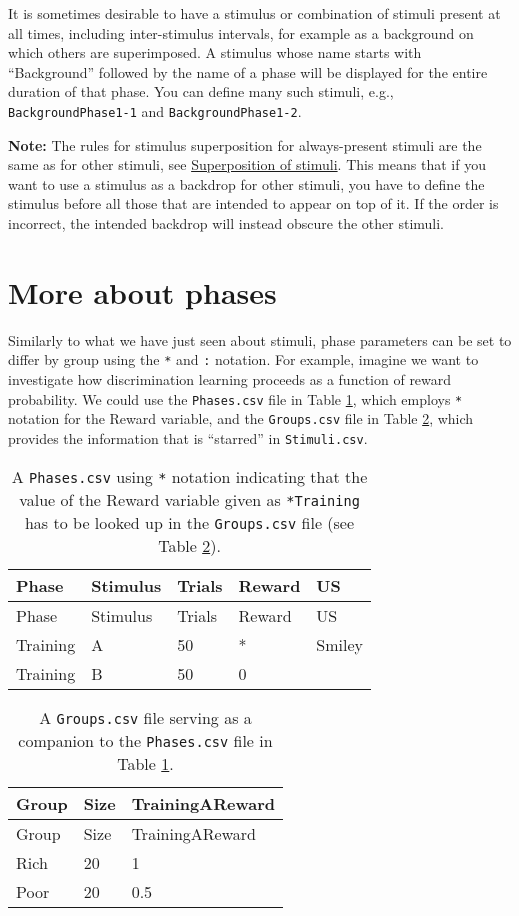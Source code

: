 \documentclass[11pt,]{article}
\begin{document}
It is sometimes desirable to have a stimulus or combination of stimuli
present at all times, including inter-stimulus intervals, for example as
a background on which others are superimposed. A stimulus whose name
starts with ``Background'' followed by the name of a phase will be
displayed for the entire duration of that phase. You can define many
such stimuli, e.g., \texttt{BackgroundPhase1-1} and
\texttt{BackgroundPhase1-2}.

\textbf{Note:} The rules for stimulus superposition for always-present
stimuli are the same as for other stimuli, see
\hyperref[stimulus-superposition]{Superposition of stimuli}. This means
that if you want to use a stimulus as a backdrop for other stimuli, you
have to define the stimulus before all those that are intended to appear
on top of it. If the order is incorrect, the intended backdrop will
instead obscure the other stimuli.

\section{More about phases}\label{more-about-phases}

Similarly to what we have just seen about stimuli, phase parameters can
be set to differ by group using the \texttt{*} and \texttt{:} notation.
For example, imagine we want to investigate how discrimination learning
proceeds as a function of reward probability. We could use the
\texttt{Phases.csv} file in Table \ref{phases-star-notation}, which
employs \texttt{*} notation for the Reward variable, and the
\texttt{Groups.csv} file in Table \ref{groups-phases-star-notation},
which provides the information that is ``starred'' in
\texttt{Stimuli.csv}.

\begin{longtable}[c]{@{}lllll@{}}
\caption{A \texttt{Phases.csv} using \texttt{*} notation indicating that
the value of the Reward variable given as \texttt{*Training} has to be
looked up in the \texttt{Groups.csv} file (see Table
\ref{groups-phases-star-notation}).
\label{phases-star-notation}}\tabularnewline
\toprule
Phase & Stimulus & Trials & Reward & US\tabularnewline
\midrule
\endfirsthead
\toprule
Phase & Stimulus & Trials & Reward & US\tabularnewline
\midrule
\endhead
Training & A & 50 & * & Smiley\tabularnewline
Training & B & 50 & 0 &\tabularnewline
\bottomrule
\end{longtable}

\begin{longtable}[c]{@{}lll@{}}
\caption{A \texttt{Groups.csv} file serving as a companion to the
\texttt{Phases.csv} file in Table \ref{phases-star-notation}.
\label{groups-phases-star-notation}}\tabularnewline
\toprule
Group & Size & TrainingAReward\tabularnewline
\midrule
\endfirsthead
\toprule
Group & Size & TrainingAReward\tabularnewline
\midrule
\endhead
Rich & 20 & 1\tabularnewline
Poor & 20 & 0.5\tabularnewline
\bottomrule
\end{longtable}
\end{document}
